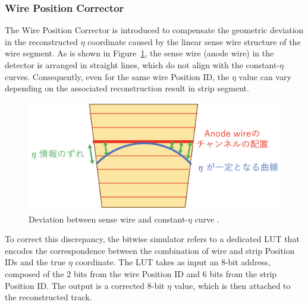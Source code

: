 \subsubsection{Wire Position Corrector}

The Wire Position Corrector is introduced to compensate the geometric deviation in the reconstructed \(\eta\) coordinate caused by the linear sense wire structure of the wire segment. As is shown in Figure~\ref{fig:wire_corr}, the sense wire (anode wire) in the detector is arranged in straight lines, which do not align with the constant-\(\eta\) curves. Consequently, even for the same wire Position ID, the \(\eta\) value can vary depending on the associated reconstruction result in strip segment.

\begin{figure}[htbp]
  \centering
  \includegraphics[width=1.0\textwidth]{figs/chapter5/wire_corr.png}
  \caption{Deviation between sense wire and constant-\(\eta\) curve \cite{yamashita}.}
  \label{fig:wire_corr}
\end{figure}

To correct this discrepancy, the bitwise simulator refers to a dedicated LUT that encodes the correspondence between the combination of wire and strip Position IDs and the true \(\eta\) coordinate. The LUT takes as input an 8-bit address, composed of the 2 bits from the wire Position ID and 6 bits from the strip Position ID. The output is a corrected 8-bit \(\eta\) value, which is then attached to the reconstructed track.

